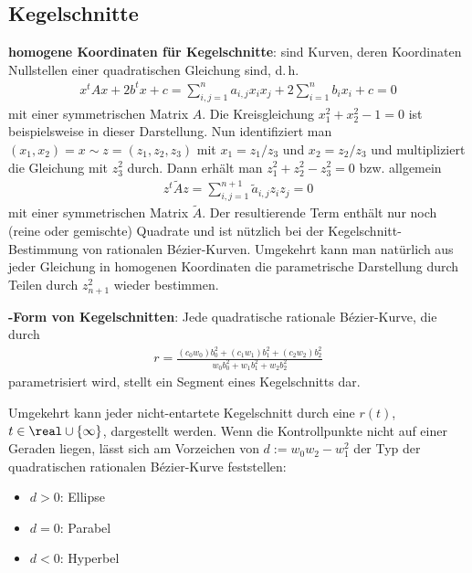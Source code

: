 \pagebreak

\subsection{%
    Kegelschnitte%
}

\textbf{homogene Koordinaten für Kegelschnitte}:
 sind Kurven, deren Koordinaten Nullstellen einer quadratischen Gleichung
sind, d.\,h.
\begin{align*}
    x^t A x + 2 b^t x + c = \sum_{i,j=1}^n a_{i,j} x_i x_j + 2 \sum_{i=1}^n b_i x_i + c = 0
\end{align*}
mit einer symmetrischen Matrix $A$.
Die Kreisgleichung $x_1^2 + x_2^2 - 1 = 0$ ist beispielsweise in dieser Darstellung.
Nun identifiziert man $(x_1, x_2) = x \sim z = (z_1, z_2, z_3)$ mit
$x_1 = z_1/z_3$ und $x_2 = z_2/z_3$ und multipliziert die Gleichung mit $z_3^2$ durch.
Dann erhält man $z_1^2 + z_2^2 - z_3^2 = 0$ bzw. allgemein
\begin{align*}
    z^t \widetilde{A} z = \sum_{i,j=1}^{n+1} \widetilde{a}_{i,j} z_i z_j = 0
\end{align*}
mit einer symmetrischen Matrix $\widetilde{A}$.
Der resultierende Term enthält nur noch (reine oder gemischte) Quadrate
und ist nützlich bei der Kegelschnitt-Bestimmung von rationalen Bézier-Kurven.
Umgekehrt kann man natürlich aus jeder Gleichung in homogenen Koordinaten die parametrische
Darstellung durch Teilen durch $z_{n+1}^2$ wieder bestimmen.

\linie

\textbf{-Form von Kegelschnitten}:
Jede quadratische rationale Bézier-Kurve, die durch
\begin{align*}
    r = \frac{(c_0 w_0) b_0^2 + (c_1 w_1) b_1^2 + (c_2 w_2) b_2^2}
    {w_0 b_0^2 + w_1 b_1^2 + w_2 b_2^2}
\end{align*}
parametrisiert wird, stellt ein Segment eines Kegelschnitts dar.

Umgekehrt kann jeder nicht-entartete Kegelschnitt durch eine 
$r(t)$, $t \in \real \cup \{\infty\}$, dargestellt werden.
Wenn die Kontrollpunkte nicht auf einer Geraden liegen, lässt sich am Vorzeichen von
$d := w_0 w_2 - w_1^2$ der Typ der quadratischen rationalen Bézier-Kurve feststellen:
\begin{itemize}
    \item
    $d > 0$: Ellipse

    \item
    $d = 0$: Parabel

    \item
    $d < 0$: Hyperbel
\end{itemize}

